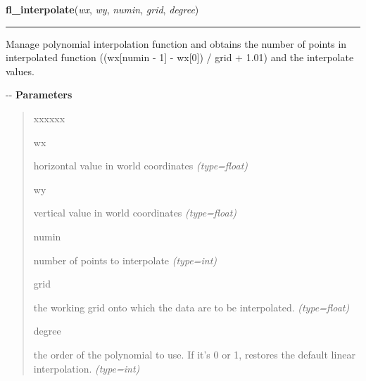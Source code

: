     \label{xformslib:flxyplot:fl_interpolate}

    \vspace{0.5ex}

\hspace{.8\funcindent}\begin{boxedminipage}{\funcwidth}

    \raggedright \textbf{fl\_interpolate}(\textit{wx}, \textit{wy}, \textit{numin}, \textit{grid}, \textit{degree})

    \vspace{-1.5ex}

    \rule{\textwidth}{0.5\fboxrule}
\setlength{\parskip}{2ex}

Manage polynomial interpolation function and obtains the number of
points in interpolated function ((wx{[}numin - 1{]} - wx{[}0{]}) / grid + 1.01)
and the interpolate values.

-{}-
\setlength{\parskip}{1ex}
      \textbf{Parameters}
      \vspace{-1ex}

      \begin{quote}
        \begin{Ventry}{xxxxxx}

          \item[wx]


horizontal value in world coordinates
            {\it (type=float)}

          \item[wy]


vertical value in world coordinates
            {\it (type=float)}

          \item[numin]


number of points to interpolate
            {\it (type=int)}

          \item[grid]


the working grid onto which the data are to be interpolated.
            {\it (type=float)}

          \item[degree]


the order of the polynomial to use. If it's 0 or 1, restores the
default linear interpolation.
            {\it (type=int)}

        \end{Ventry}


\end{quote}
\end{boxedminipage}
